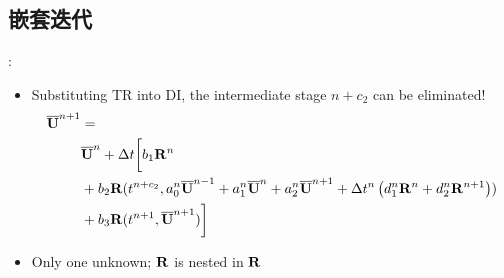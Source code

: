 \documentclass[aspectratio=169,serif]{beamer} %
\begin{document}
\subsection{嵌套迭代}


\begin{frame}{\secname: \subsecname}
  \begin{itemize}
    \item Substituting TR into DI, the intermediate stage $n+c_2$ can be eliminated!
          \begin{equation}
            \begin{aligned}
              \overline{\mathbf{U}}^{n+1} & =                       \\
                        & \overline{\mathbf{U}}^{n} + {\Delta} t\biggl[
              b_1 \mathbf{R}^n                            \\
                        & +
                b_2 \mathbf{R}(t^{n+c_2},a^n_0\overline{\mathbf{U}}^{n - 1} +
                a^n_1\overline{\mathbf{U}}^{n} +
                a^n_2\overline{\mathbf{U}}^{n + 1}
                +
                {\Delta} t^n
                \left(
                d^n_1\mathbf{R}^{n} +
                d^n_2\mathbf{R}^{n + 1}
              \right))                            \\
                        & +
                b_3 \mathbf{R}(t^{n+1},\overline{\mathbf{U}}^{n+1})
                \biggr]
              \label{eq:nestedDITR}
            \end{aligned}
          \end{equation}
    \item Only one unknown; $\mathbf{R}$ is nested in $\mathbf{R}$
  \end{itemize}
\end{frame}
\end{document}
